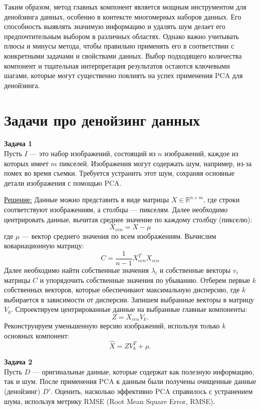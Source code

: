 Таким образом, метод главных компонент является мощным инструментом для денойзинга данных, особенно в контексте многомерных наборов данных. Его способность выявлять значимую информацию и удалять шум делает его предпочтительным выбором в различных областях. Однако важно учитывать плюсы и минусы метода, чтобы правильно применять его в соответствии с конкретными задачами и свойствами данных. Выбор подходящего количества компонент и тщательная интерпретация результатов остаются ключевыми шагами, которые могут существенно повлиять на успех применения PCA для денойзинга.

\section{Задачи про денойзинг данных}
\textbf{Задача 1}\\
Пусть \( I \) — это набор изображений, состоящий из \( n \) изображений, каждое из которых имеет \( m \) пикселей. Изображения могут содержать шум, например, из-за помех во время съемки. Требуется устранить этот шум, сохраняя основные детали изображения с помощью PCA.

\underline{Решение:}
Данные можно представить в виде матрицы \( X \in \mathbb{R}^{n \times m} \), где строки соответствуют изображениям, а столбцы — пикселям. Далее необходимо центрировать данные, вычитая среднее значение по каждому столбцу (пикселю):
   \[
   X_{cen} = X - \mu
   \]
   где \( \mu \) — вектор среднего значения по всем изображениям.
Вычислим ковариационную матрицу:
   \[
   C = \frac{1}{n-1} X_{cen}^T X_{cen}
   \]
Далее необходимо найти собственные значения \( \lambda_i \) и собственные векторы \( v_i \) матрицы \( C \) и упорядочить собственные значения по убыванию. Отберем первые \( k \) собственных векторов, которые обеспечивают максимальную дисперсию, где \( k \) выбирается в зависимости от дисперсии. Запишем выбранные векторы в матрицу \( V_k \).
Спроектируем центрированные данные на выбранные главные компоненты:
   \[
   Z = X_{cen} V_k.
   \]
Реконструируем уменьшенную версию изображений, используя только \( k \) основных компонент:
   \[
   \hat{X} = Z V_k^T + \mu.
   \]

\textbf{Задача 2}\\
Пусть \( D \) --- оригинальные данные, которые содержат как полезную информацию, так и шум. После применения PCA к данным были получены очищенные данные (денойзинг) \( D' \). Оценить, насколько эффективно PCA справилось с устранением шума, используя метрику RMSE (Root Mean Square Error, RMSE).

